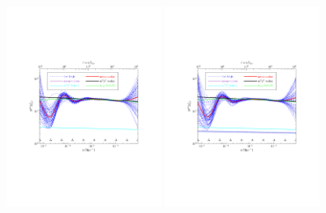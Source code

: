 \documentclass[11pt]{article}
\def \halffigwidth{0.45\textwidth}
\begin{document}
\begin{figure}
  \includegraphics[width=\halffigwidth,  trim = 1in 3in 1in 3in]{nobicep_spline0_p11_r0d02_power_traj.pdf}%
  \includegraphics[width=\halffigwidth,  trim = 1in 3in 1in 3in]{nobicep_spline0_p11_r0d1_power_traj.pdf}

\end{figure}
\end{document}
